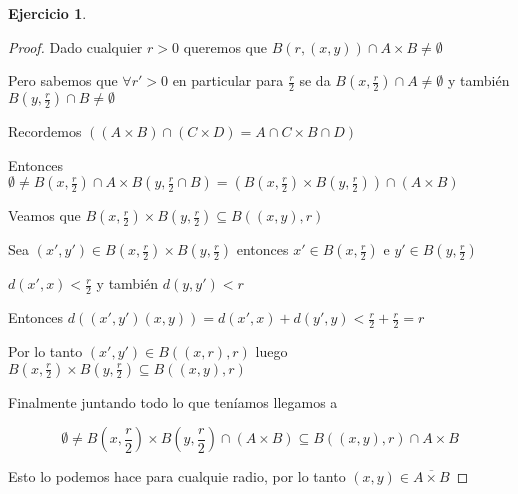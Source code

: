 \documentclass[11pt]{report}
\newcommand{\ol}{\overline}
\theoremstyle{definition}
\newtheorem{ej}{Ejercicio}
\begin{document}
\begin{ej}
\begin{enumerate}
\begin{proof}
	Dado cualquier $r>0$ queremos que $B(r,(x,y)) \cap A \times B \neq \emptyset$

	Pero sabemos que $\forall r' > 0$ en particular para $\frac{r}{2}$ se da $B(x,\frac{r}{2}) \cap A \neq \emptyset$ y también $B(y,\frac{r}{2}) \cap B \neq \emptyset$

	Recordemos $((A\times B) \cap (C \times D) = A \cap C \times B \cap D)$

	Entonces $\emptyset \neq B(x,\frac{r}{2}) \cap A \times B(y,\frac{r}{2} \cap B) = (B(x,\frac{r}{2}) \times B(y,\frac{r}{2})) \cap (A \times B)$

	Veamos que $B(x,\frac{r}{2}) \times B(y,\frac{r}{2}) \subseteq B((x,y),r)$

	Sea $(x',y') \in  B(x,\frac{r}{2}) \times B(y,\frac{r}{2})$ entonces $x' \in B(x,\frac{r}{2})$  e $y'\in B(y,\frac{r}{2})$

	$d(x',x) < \frac{r}{2}$ y también $d(y,y') < r$

	Entonces $d((x',y')(x,y)) = d(x',x) + d(y',y) < \frac{r}{2} + \frac{r}{2} = r$ 

	Por lo tanto $(x',y ') \in B((x,r),r)$ luego $B(x,\frac{r}{2}) \times B(y,\frac{r}{2})\subseteq B((x,y),r)$

	Finalmente juntando todo lo que teníamos llegamos a 

	$$ \emptyset \neq B(x,\frac{r}{2}) \times B(y,\frac{r}{2}) \cap (A \times B) \subseteq B((x,y),r) \cap A \times B$$

	Esto lo podemos hace para cualquie radio, por lo tanto $(x,y) \in \ol{A\times B}$

      \end{proof}
  \end{enumerate}
\end{ej}
\end{document}
